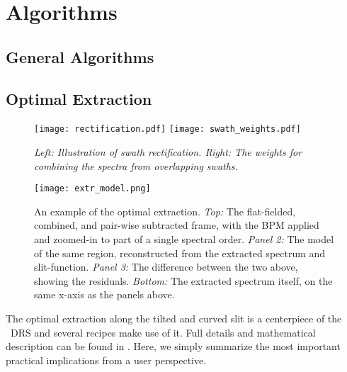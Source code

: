 \section{Algorithms}
\label{sec:algorithms}


\subsection{General Algorithms}
\label{sec:algorithms-general}

\subsection{Optimal Extraction}
\label{sec:extract}
\begin{figure}[ht]
    \begin{center}
\texttt{[image: rectification.pdf]}
\texttt{[image: swath\_weights.pdf]}
\end{center}
\caption{\it Left: Illustration of swath rectification. Right: The weights for combining the spectra from overlapping swaths.}
\label{fig:swaths}
\end{figure}

\begin{figure}[ht]
    \begin{center}
\texttt{[image: extr\_model.png]}
\end{center}
\caption{An example of the optimal extraction. \emph{Top:} The flat-fielded,
combined, and pair-wise subtracted frame, with the BPM applied and zoomed-in to
part of a single spectral order. \emph{Panel 2:} The model of the same region,
reconstructed from the extracted spectrum and slit-function. \emph{Panel 3:} The
difference between the two above, showing the residuals. \emph{Bottom:} The extracted
spectrum itself, on the same x-axis as the panels above.}
\label{fig:extrmodel}
\end{figure}

The optimal extraction along the tilted and curved slit is a centerpiece of the
\instrument\ DRS and several recipes make use of it. Full details and
mathematical description can be found in \cite{2021A&A...646A..32P}. Here, we
simply summarize the most important practical implications from a user
perspective.

